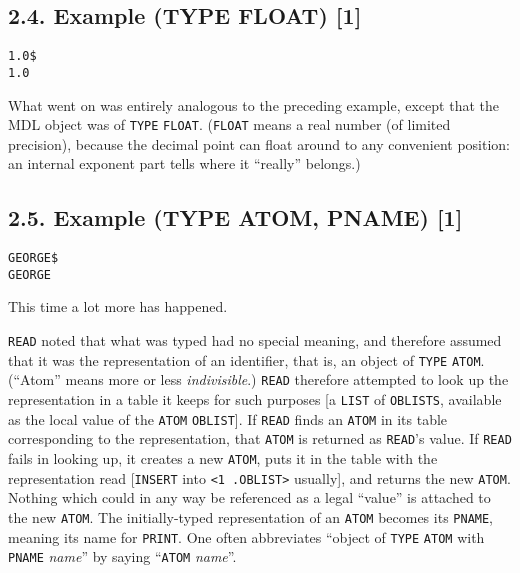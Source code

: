 \documentclass[a4paper,]{article}
\begin{document}
\subsection{2.4. Example (TYPE FLOAT) {[}1{]}}\label{example-type-float-1}

\begin{verbatim}
1.0$
1.0
\end{verbatim}

What went on was entirely analogous to the preceding example, except that the MDL object was of \texttt{TYPE}
\texttt{FLOAT}. (\texttt{FLOAT} means a real number (of limited precision), because the decimal point
can float around to any convenient position: an internal exponent part tells where it ``really'' belongs.)

\subsection{2.5. Example (TYPE ATOM, PNAME) {[}1{]}}\label{example-type-atom-pname-1}

\begin{verbatim}
GEORGE$
GEORGE
\end{verbatim}

This time a lot more has happened.

\texttt{READ} noted that what was typed had no special meaning, and therefore assumed that it was the representation of an
identifier, that is, an object of \texttt{TYPE} \texttt{ATOM}. (``Atom'' means more or less
\emph{indivisible}.) \texttt{READ} therefore attempted to look up the representation in a table it keeps for such purposes
{[}a \texttt{LIST} of \texttt{OBLISTS}, available as the local value of the \texttt{ATOM} \texttt{OBLIST}{]}. If
\texttt{READ} finds an \texttt{ATOM} in its table corresponding to the representation, that \texttt{ATOM} is returned as
\texttt{READ}'s value. If \texttt{READ} fails in looking up, it creates a new \texttt{ATOM}, puts it in the table with the
representation read {[}\texttt{INSERT} into \texttt{\textless{}1\ .OBLIST\textgreater{}} usually{]}, and returns the new
\texttt{ATOM}. Nothing which could in any way be referenced as a legal ``value'' is attached to the new \texttt{ATOM}. The
initially-typed representation of an \texttt{ATOM} becomes its \texttt{PNAME}, meaning its name for
\texttt{PRINT}. One often abbreviates ``object of \texttt{TYPE} \texttt{ATOM} with \texttt{PNAME} \emph{name}'' by saying
``\texttt{ATOM} \emph{name}''.
\end{document}
